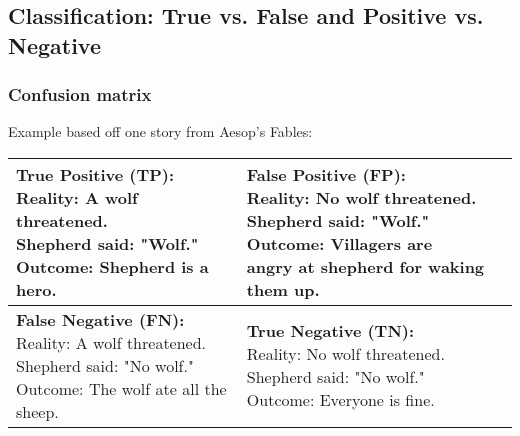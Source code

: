 \documentclass[12pt,a4paper]{article}
\begin{document}
\subsection*{Classification: True vs. False and Positive vs. Negative}
\label{sec-9-2}

\subsubsection*{Confusion matrix}
\label{sec-9-2-1}
Example       based off   one story from   Aesop's Fables:
\begin{table}[h!]
\begin{tabular}{|l|l|}
\hline
\makecell[l]{\textbf{True Positive (TP):}\\
Reality: A wolf threatened. \\
Shepherd said: "Wolf." \\
Outcome: Shepherd is a hero.   }         & 
\makecell[l]{\textbf{False Positive (FP):}\\
Reality: No wolf threatened. \\
Shepherd said: "Wolf." \\
Outcome: Villagers are \\ angry at shepherd for waking them up.}          \\ \hline
\makecell[l]{\textbf{False Negative (FN):}\\
Reality: A wolf threatened. \\
Shepherd said: "No wolf." \\
Outcome: The wolf ate all the sheep.}          & 
\makecell[l]{\textbf{True Negative (TN):}\\
Reality: No wolf threatened. \\
Shepherd said: "No wolf." \\
Outcome: Everyone is fine.  }                              \\ \hline
\end{tabular}
\end{table}
\end{document}
